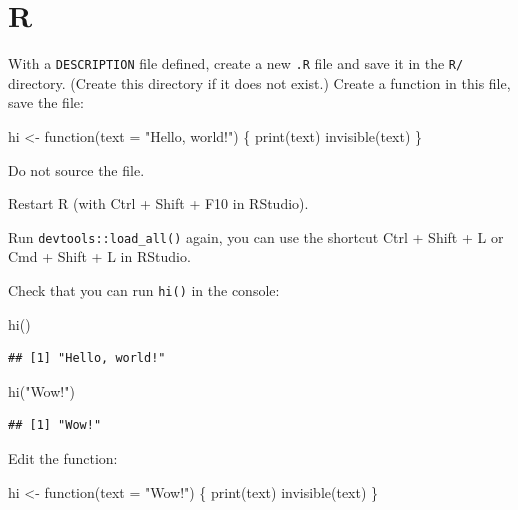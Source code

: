 \documentclass[]{book}
\newenvironment{Shaded}{}{}
\newcommand{\ControlFlowTok}[1]{\textcolor[rgb]{0.00,0.00,1.00}{#1}}
\newcommand{\DataTypeTok}[1]{#1}
\newcommand{\KeywordTok}[1]{\textcolor[rgb]{0.00,0.00,1.00}{#1}}
\newcommand{\NormalTok}[1]{#1}
\newcommand{\StringTok}[1]{\textcolor[rgb]{0.00,0.50,0.50}{#1}}
\begin{document}
\hypertarget{r}{%
\section{R}\label{r}}

With a \texttt{DESCRIPTION} file defined, create a new \texttt{.R} file and save it in the \texttt{R/} directory.
(Create this directory if it does not exist.)
Create a function in this file, save the file:

\begin{Shaded}
\begin{Highlighting}[]
\NormalTok{hi <-}\StringTok{ }\ControlFlowTok{function}\NormalTok{(}\DataTypeTok{text =} \StringTok{"Hello, world!"}\NormalTok{) \{}
  \KeywordTok{print}\NormalTok{(text)}
  \KeywordTok{invisible}\NormalTok{(text)}
\NormalTok{\}}
\end{Highlighting}
\end{Shaded}

Do not source the file.

Restart R (with Ctrl + Shift + F10 in RStudio).

Run \texttt{devtools::load\_all()} again, you can use the shortcut Ctrl + Shift + L or Cmd + Shift + L in RStudio.

Check that you can run \texttt{hi()} in the console:

\begin{Shaded}
\begin{Highlighting}[]
\KeywordTok{hi}\NormalTok{()}
\end{Highlighting}
\end{Shaded}

\begin{verbatim}
## [1] "Hello, world!"
\end{verbatim}

\begin{Shaded}
\begin{Highlighting}[]
\KeywordTok{hi}\NormalTok{(}\StringTok{"Wow!"}\NormalTok{)}
\end{Highlighting}
\end{Shaded}

\begin{verbatim}
## [1] "Wow!"
\end{verbatim}

Edit the function:

\begin{Shaded}
\begin{Highlighting}[]
\NormalTok{hi <-}\StringTok{ }\ControlFlowTok{function}\NormalTok{(}\DataTypeTok{text =} \StringTok{"Wow!"}\NormalTok{) \{}
  \KeywordTok{print}\NormalTok{(text)}
  \KeywordTok{invisible}\NormalTok{(text)}
\NormalTok{\}}
\end{Highlighting}
\end{Shaded}
\end{document}
